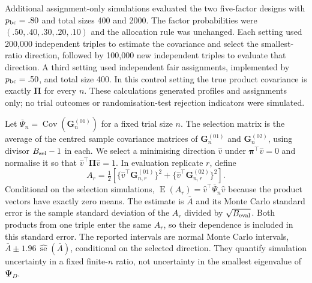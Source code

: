 \documentclass[12pt,a4paper]{article}
\theoremstyle{definition}
\theoremstyle{remark}\newtheorem{remark}{Remark}
\numberwithin{equation}{section}
\newcommand{\E}{\operatorname{E}}
\newcommand{\Cov}{\operatorname{Cov}}
\begin{document}
Additional assignment-only simulations evaluated the two five-factor designs with $p_{\rm bc}=.80$ and total sizes 400 and 2000. The factor probabilities were $(.50,.40,.30,.20,.10)$ and the allocation rule was unchanged. Each setting used 200,000 independent triples to estimate the covariance and select the smallest-ratio direction, followed by 100,000 new independent triples to evaluate that direction. A third setting used independent fair assignments, implemented by $p_{\rm bc}=.50$, and total size 400. In this control setting the true product covariance is exactly $\bm\Pi$ for every $n$. These calculations generated profiles and assignments only; no trial outcomes or randomisation-test rejection indicators were simulated.

Let $\overline\Psi_n=\Cov(\bm G_n^{(01)})$ for a fixed trial size $n$. The selection matrix is the average of the centred sample covariance matrices of $\bm G_n^{(01)}$ and $\bm G_n^{(02)}$, using divisor $B_{\rm sel}-1$ in each. We select a minimising direction $\widehat v$ under $\bm\pi^\top\widehat v=0$ and normalise it so that $\widehat v^\top\bm\Pi\widehat v=1$. In evaluation replicate $r$, define
\[
 A_r=\tfrac12\left[\{\widehat v^\top\bm G_{n,r}^{(01)}\}^2+
                        \{\widehat v^\top\bm G_{n,r}^{(02)}\}^2\right].
\]
Conditional on the selection simulations, $\E(A_r)=\widehat v^\top\overline\Psi_n\widehat v$ because the product vectors have exactly zero means. The estimate is $\bar A$ and its Monte Carlo standard error is the sample standard deviation of the $A_r$ divided by $\sqrt{B_{\rm eval}}$. Both products from one triple enter the same $A_r$, so their dependence is included in this standard error. The reported intervals are normal Monte Carlo intervals, $\bar A\pm1.96\,\widehat{\operatorname{se}}(\bar A)$, conditional on the selected direction. They quantify simulation uncertainty in a fixed finite-$n$ ratio, not uncertainty in the smallest eigenvalue of $\bm\Psi_D$.
\end{document}

